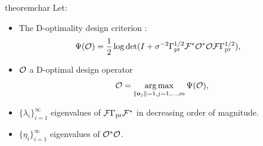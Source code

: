 \begin{restatable}{theorem}{char}\label{thm:char}
  Let:
  \begin{itemize}
    \item The D-optimality design criterion
    \cite{AlexanderianGloorGhattas14}:
    \begin{align*}
      \begin{split}
        \tar(\obs) %
        &= \frac12 \log \det ( I + \sigma^{-2} \prcov^{1/2} \fwd ^*
        \obs^* \obs \fwd \prcov^{1/2}), 
      \end{split}
    \end{align*}
  \item $\mathcal{O}$ a D-optimal design operator
    \begin{equation*}
      \obs = \argmax_{\|\meas_j\| = 1, j=1,\dots,m}\tar(\obs),
    \end{equation*}
  \item $\{\lambda_i\}_{i=1}^\infty$ eigenvalues of
    $\mathcal{F}\Gamma_{\textup{pr}}\mathcal{F}^*$ in decreasing order of magnitude.
  \item $\{\eta_i\}_{i=1}^\infty$ eigenvalues of $\mathcal{O}^*\mathcal{O}$.
 
  \end{itemize}


\end{restatable}
